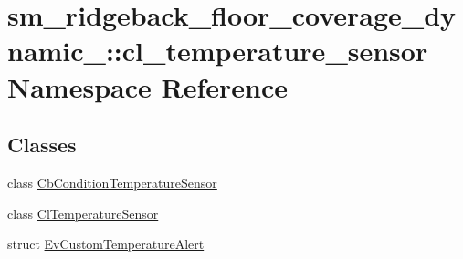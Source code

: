 \hypertarget{namespacesm__ridgeback__floor__coverage__dynamic__1_1_1cl__temperature__sensor}{}\section{sm\+\_\+ridgeback\+\_\+floor\+\_\+coverage\+\_\+dynamic\+\_\+:\+:cl\+\_\+temperature\+\_\+sensor Namespace Reference}
\label{namespacesm__ridgeback__floor__coverage__dynamic__1_1_1cl__temperature__sensor}
\subsection*{Classes}
\begin{DoxyCompactItemize}
\item 
class \hyperlink{classsm__ridgeback__floor__coverage__dynamic__1_1_1cl__temperature__sensor_1_1CbConditionTemperatureSensor}{Cb\+Condition\+Temperature\+Sensor}
\item 
class \hyperlink{classsm__ridgeback__floor__coverage__dynamic__1_1_1cl__temperature__sensor_1_1ClTemperatureSensor}{Cl\+Temperature\+Sensor}
\item 
struct \hyperlink{structsm__ridgeback__floor__coverage__dynamic__1_1_1cl__temperature__sensor_1_1EvCustomTemperatureAlert}{Ev\+Custom\+Temperature\+Alert}
\end{DoxyCompactItemize}
